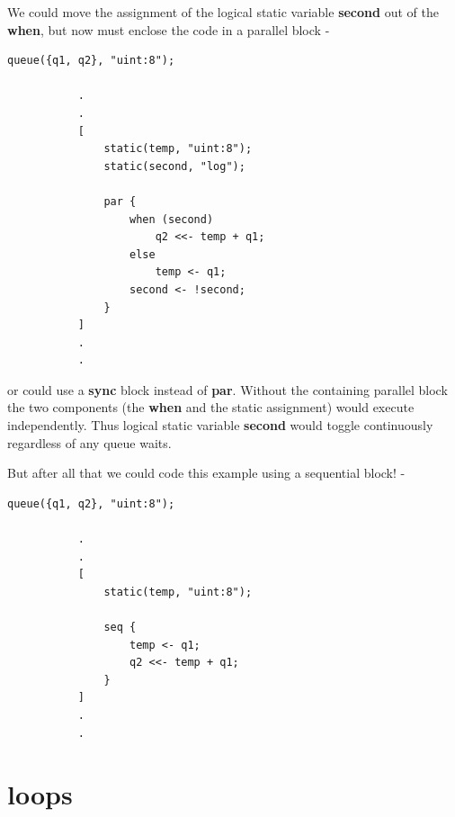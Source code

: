         We could move the assignment of the logical static
        variable {\bf second} out of the {\bf when}, but now must
        enclose the code in a parallel block -
        \begin{lstlisting}[gobble=8, language=threepl]
           queue({q1, q2}, "uint:8");

           .
           .
           [
               static(temp, "uint:8");
               static(second, "log");

               par {
                   when (second)
                       q2 <<- temp + q1;
                   else
                       temp <- q1;
                   second <- !second;
               }
           ]
           .
           .
        \end{lstlisting}
        or could use a {\bf sync} block instead of {\bf par}.
        Without the containing parallel block the two
        components (the {\bf when} and the static assignment)
        would execute independently. Thus logical static
        variable {\bf second} would toggle continuously
        regardless of any queue waits.

        But after all that we could code this example using a sequential
        block! -
        \begin{lstlisting}[gobble=8, language=threepl]
           queue({q1, q2}, "uint:8");

           .
           .
           [
               static(temp, "uint:8");

               seq {
                   temp <- q1;
                   q2 <<- temp + q1;
               }
           ]
           .
           .

        \end{lstlisting}



    \section{loops}
    
